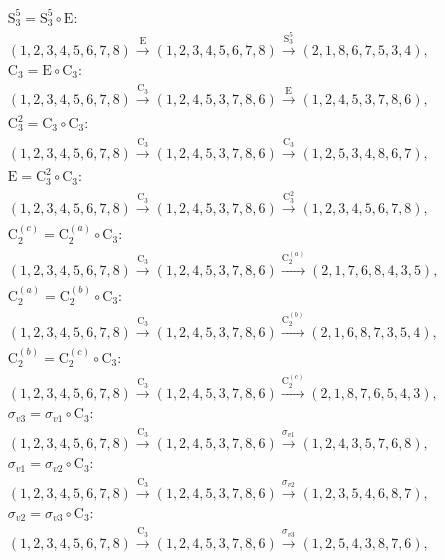 \begin{align*}
& \mathrm{S}_{3}^{5} = \mathrm{S}_{3}^{5} \circ \mathrm{E}:\; \\& (1,2,3,4,5,6,7,8) \xrightarrow{\mathrm{E}} (1,2,3,4,5,6,7,8) \xrightarrow{\mathrm{S}_{3}^{5}} (2,1,8,6,7,5,3,4), \\
& \mathrm{C}_{3} = \mathrm{E} \circ \mathrm{C}_{3}:\; \\& (1,2,3,4,5,6,7,8) \xrightarrow{\mathrm{C}_{3}} (1,2,4,5,3,7,8,6) \xrightarrow{\mathrm{E}} (1,2,4,5,3,7,8,6), \\
& \mathrm{C}_{3}^{2} = \mathrm{C}_{3} \circ \mathrm{C}_{3}:\; \\& (1,2,3,4,5,6,7,8) \xrightarrow{\mathrm{C}_{3}} (1,2,4,5,3,7,8,6) \xrightarrow{\mathrm{C}_{3}} (1,2,5,3,4,8,6,7), \\
& \mathrm{E} = \mathrm{C}_{3}^{2} \circ \mathrm{C}_{3}:\; \\& (1,2,3,4,5,6,7,8) \xrightarrow{\mathrm{C}_{3}} (1,2,4,5,3,7,8,6) \xrightarrow{\mathrm{C}_{3}^{2}} (1,2,3,4,5,6,7,8), \\
& \mathrm{C}_{2}^{(c)} = \mathrm{C}_{2}^{(a)} \circ \mathrm{C}_{3}:\; \\& (1,2,3,4,5,6,7,8) \xrightarrow{\mathrm{C}_{3}} (1,2,4,5,3,7,8,6) \xrightarrow{\mathrm{C}_{2}^{(a)}} (2,1,7,6,8,4,3,5), \\
& \mathrm{C}_{2}^{(a)} = \mathrm{C}_{2}^{(b)} \circ \mathrm{C}_{3}:\; \\& (1,2,3,4,5,6,7,8) \xrightarrow{\mathrm{C}_{3}} (1,2,4,5,3,7,8,6) \xrightarrow{\mathrm{C}_{2}^{(b)}} (2,1,6,8,7,3,5,4), \\
& \mathrm{C}_{2}^{(b)} = \mathrm{C}_{2}^{(c)} \circ \mathrm{C}_{3}:\; \\& (1,2,3,4,5,6,7,8) \xrightarrow{\mathrm{C}_{3}} (1,2,4,5,3,7,8,6) \xrightarrow{\mathrm{C}_{2}^{(c)}} (2,1,8,7,6,5,4,3), \\
& \sigma_{v3} = \sigma_{v1} \circ \mathrm{C}_{3}:\; \\& (1,2,3,4,5,6,7,8) \xrightarrow{\mathrm{C}_{3}} (1,2,4,5,3,7,8,6) \xrightarrow{\sigma_{v1}} (1,2,4,3,5,7,6,8), \\
& \sigma_{v1} = \sigma_{v2} \circ \mathrm{C}_{3}:\; \\& (1,2,3,4,5,6,7,8) \xrightarrow{\mathrm{C}_{3}} (1,2,4,5,3,7,8,6) \xrightarrow{\sigma_{v2}} (1,2,3,5,4,6,8,7), \\
& \sigma_{v2} = \sigma_{v3} \circ \mathrm{C}_{3}:\; \\& (1,2,3,4,5,6,7,8) \xrightarrow{\mathrm{C}_{3}} (1,2,4,5,3,7,8,6) \xrightarrow{\sigma_{v3}} (1,2,5,4,3,8,7,6), \\

\end{align*}
